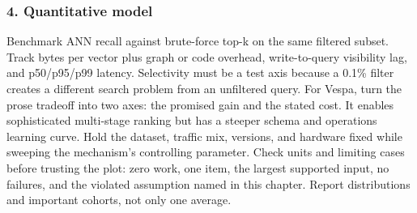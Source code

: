 \subsubsection*{4. Quantitative model}
Benchmark ANN recall against brute-force top-k on the same filtered subset. Track bytes per vector plus graph or code overhead, write-to-query visibility lag, and p50/p95/p99 latency. Selectivity must be a test axis because a 0.1\% filter creates a different search problem from an unfiltered query.
For Vespa, turn the prose tradeoff into two axes: the promised gain and the stated cost. It enables sophisticated multi-stage ranking but has a steeper schema and operations learning curve. Hold the dataset, traffic mix, versions, and hardware fixed while sweeping the mechanism's controlling parameter.
Check units and limiting cases before trusting the plot: zero work, one item, the largest supported input, no failures, and the violated assumption named in this chapter. Report distributions and important cohorts, not only one average.
